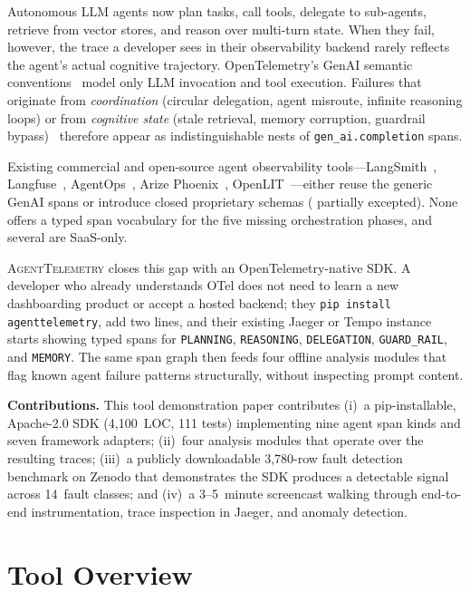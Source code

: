\documentclass[10pt,conference]{IEEEtran}
\begin{document}
Autonomous LLM agents now plan tasks, call tools, delegate to
sub-agents, retrieve from vector stores, and reason over multi-turn
state. When they fail, however, the trace a developer sees in their
observability backend rarely reflects the agent's actual cognitive
trajectory. OpenTelemetry's GenAI semantic conventions~\cite{otel,
otel_genai} model only LLM invocation and tool execution. Failures
that originate from \emph{coordination} (circular delegation,
agent misroute, infinite reasoning loops) or from \emph{cognitive
state} (stale retrieval, memory corruption, guardrail
bypass)~\cite{mast, agentops_paper} therefore appear as
indistinguishable nests of \texttt{gen\_ai.completion} spans.

Existing commercial and open-source agent observability
tools---LangSmith~\cite{langsmith}, Langfuse~\cite{langfuse},
AgentOps~\cite{agentops}, Arize Phoenix~\cite{phoenix},
OpenLIT~\cite{openlit}---either reuse the generic GenAI spans or
introduce closed proprietary schemas (\cite{openinference}
partially excepted). None offers a typed span vocabulary for the
five missing orchestration phases, and several are SaaS-only.

\textsc{AgentTelemetry} closes this gap with an OpenTelemetry-native
SDK. A developer who already understands OTel does not need to
learn a new dashboarding product or accept a hosted backend; they
\texttt{pip install agenttelemetry}, add two lines, and their
existing Jaeger or Tempo instance starts showing typed spans for
\texttt{PLANNING}, \texttt{REASONING}, \texttt{DELEGATION},
\texttt{GUARD\_RAIL}, and \texttt{MEMORY}. The same span graph then
feeds four offline analysis modules that flag known agent failure
patterns structurally, without inspecting prompt content.

\noindent\textbf{Contributions.} This tool demonstration paper
contributes (i)~a pip-installable, Apache-2.0 SDK
(4{,}100~LOC, 111 tests) implementing nine agent span kinds and
seven framework adapters; (ii)~four analysis modules that
operate over the resulting traces; (iii)~a publicly downloadable
3{,}780-row fault detection benchmark on Zenodo that demonstrates
the SDK produces a detectable signal across 14~fault classes; and
(iv)~a 3--5~minute screencast walking through end-to-end
instrumentation, trace inspection in Jaeger, and anomaly detection.

\section{Tool Overview}
\label{sec:overview}
\end{document}

